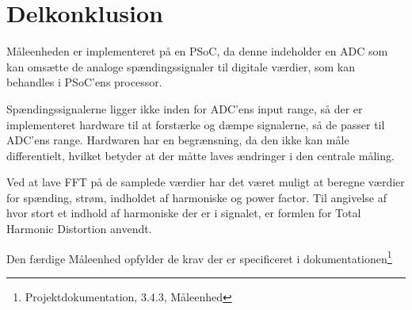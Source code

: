
\section{Delkonklusion}

Måleenheden er implementeret på en PSoC, da denne indeholder en ADC som kan omsætte de analoge spændingssignaler til digitale værdier, som kan behandles i PSoC'ens processor. 

Spændingssignalerne ligger ikke inden for ADC'ens input range, så der er implementeret hardware til at forstærke og dæmpe signalerne, så de passer til ADC'ens range. Hardwaren har en begrænsning, da den ikke kan måle differentielt, hvilket betyder at der måtte laves ændringer i den centrale måling. 

Ved at lave FFT på de samplede værdier har det været muligt at beregne værdier for spænding, strøm, indholdet af harmoniske og power factor. Til angivelse af hvor stort et indhold af harmoniske der er i signalet, er formlen for Total Harmonic Distortion anvendt.

Den færdige Måleenhed opfylder de krav der er specificeret i dokumentationen\footnote{Projektdokumentation, 3.4.3, Måleenhed}


